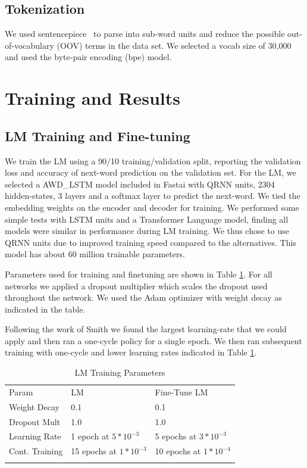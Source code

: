 \documentclass[runningheads]{llncs}
\begin{document}
\subsection{Tokenization}
We used sentencepiece~\cite{SentencePiece:DBLP:journals/corr/abs-1808-06226} to parse into sub-word units and reduce the possible out-of-vocabulary (OOV) terms in the data set.  We selected a vocab size of 30,000 and used the byte-pair encoding (bpe) model. 

\section{Training and Results}
\label{sec:4}
\subsection{LM Training and Fine-tuning}
We train the LM using a 90/10 training/validation split, reporting the validation loss and accuracy of next-word prediction on the validation set. For the LM, we selected a AWD\_LSTM \cite{Merity:DBLP:journals/corr/abs-1708-02182} model included in Fastai with QRNN\cite{Bradbury:DBLP:journals/corr/BradburyMXS16} units, 2304 hidden-states, 3 layers and a softmax layer to predict the next-word.  We tied the embedding weights\cite{WeightTie:DBLP:journals/corr/PressW16} on the encoder and decoder for training.  We performed some simple tests with LSTM units and a Transformer Language model, finding all models were similar in performance during LM training. We thus chose to use QRNN units due to improved training speed compared to the alternatives. This model has about 60 million trainable parameters.  

Parameters used for training and finetuning are shown in Table \ref{tab:tab_training}.
For all networks we applied a dropout multiplier which scales the dropout used throughout the network.  We used the Adam optimizer with weight decay as indicated in the table.  

Following the work of Smith\cite{Smith:DBLP:journals/corr/abs-1803-09820}  we found the largest learning-rate that we could apply and then ran a one-cycle policy for a single epoch. We then ran subsequent training with one-cycle and lower learning rates indicated in Table \ref{tab:tab_training}.

\begin{table}[ht]
	\caption{LM Training Parameters}
	\label{tab:tab_training}       %
\begin{tabular}{lll}
	\hline\noalign{\smallskip}
	Param & LM & Fine-Tune LM \\
	\noalign{\smallskip}\hline\noalign{\smallskip}
	Weight Decay & 0.1 & 0.1 \\
	Dropout Mult & 1.0 & 1.0 \\
	Learning Rate & 1 epoch at $5*10^{-3}$ & 5 epochs at $3*10^{-3}$ \\
    Cont. Training & 15 epochs at $1*10^{-3}$ & 10 epochs at $1*10^{-4}$\\
	\noalign{\smallskip}\hline
\end{tabular}
\end{table}
\end{document}
